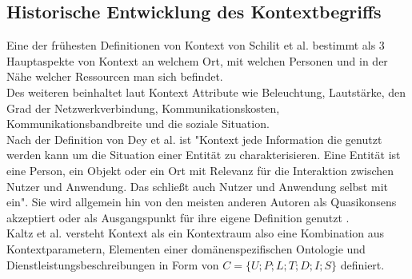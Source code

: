 \subsection{Historische Entwicklung des Kontextbegriffs}
Eine der frühesten Definitionen von Kontext von Schilit et al.\cite{schilit_context-aware_1994} bestimmt als 3 Hauptaspekte von Kontext an welchem Ort, mit welchen Personen und in der Nähe welcher Ressourcen man sich befindet.\\
Des weiteren beinhaltet laut  \cite{schilit_context-aware_1994} Kontext Attribute wie Beleuchtung, Lautstärke, den Grad der Netzwerkverbindung, Kommunikationskosten, Kommunikationsbandbreite und die soziale Situation.\\
Nach der Definition von Dey et al. \cite{dey_understanding_2001} ist "Kontext jede Information die genutzt werden kann um die Situation einer Entität zu charakterisieren. Eine Entität ist eine Person, ein Objekt oder ein Ort mit Relevanz für die Interaktion zwischen Nutzer und Anwendung. Das schließt auch Nutzer und Anwendung selbst mit ein".
Sie wird allgemein hin von den meisten anderen Autoren als Quasikonsens akzeptiert \cite{wei_liu_survey_2011,alegre_engineering_2016,aguilar_cameonto_2018} oder als Ausgangspunkt für ihre eigene Definition genutzt \cite{kokinov_operational_2007,kayes_icaf_2012}.\\
Kaltz et al. \cite{wolfgang_kaltz_context-aware_2005} versteht Kontext als ein Kontextraum also eine Kombination aus Kontextparametern, Elementen einer domänenspezifischen Ontologie %
und Dienstleistungsbeschreibungen in Form von $C = \{U;P;L;T;D;I;S\}$ definiert.
